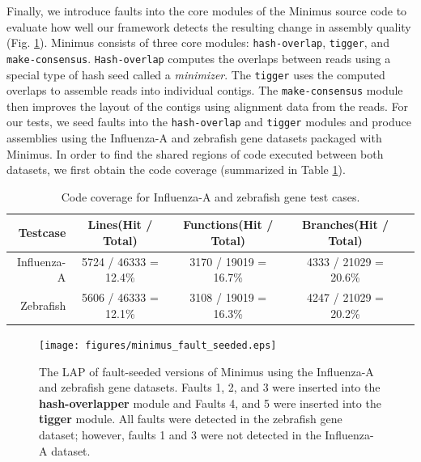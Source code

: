 \documentclass[12pt,\mydriver]{thesis}
\begin{document}
Finally, we introduce faults into the core modules of the Minimus source code to evaluate how well our framework detects the resulting change in assembly quality (Fig. \ref{fig:minimus_fault_seeded}).
Minimus consists of three core modules: \texttt{hash-overlap}, \texttt{tigger}, and \texttt{make-consensus}.
\texttt{Hash-overlap} computes the overlaps between reads using a special type of hash seed called a \emph{minimizer}\cite{roberts2004reducing}.
The \texttt{tigger} uses the computed overlaps to assemble reads into individual contigs.
The \texttt{make-consensus} module then improves the layout of the contigs using alignment data from the reads.
For our tests, we seed faults into the \texttt{hash-overlap} and \texttt{tigger} modules and produce assemblies using the Influenza-A and zebrafish gene datasets packaged with Minimus.
In order to find the shared regions of code executed between both datasets, we first obtain the code coverage (summarized in Table \ref{Tab:codecoverage}).



\renewcommand{\baselinestretch}{1}
\small\normalsize


\begin{table}[htbp]
\caption{Code coverage for Influenza-A and zebrafish gene test cases.}
\label{Tab:codecoverage}
\begin{center}
\begin{tabular}{r|cccc}
Testcase & Lines(Hit / Total) & Functions(Hit / Total) & Branches(Hit / Total)\\ \hline
Influenza-A & 5724 / 46333 = 12.4\% & 3170 / 19019 = 16.7\% & 4333 / 21029 = 20.6\% \\
Zebrafish & 5606 / 46333 = 12.1\%  & 3108 / 19019 = 16.3\% & 4247 / 21029 = 20.2\% \\
\hline
\end{tabular}
\end{center}
\end{table}

\renewcommand{\baselinestretch}{2}
\small\normalsize

\begin{figure}[!htb]\begin{center}
  \texttt{[image: figures/minimus\_fault\_seeded.eps]}
\end{center}
\renewcommand{\baselinestretch}{1}
\small\normalsize
\begin{quote}
\caption[LAP scores for fault-seeded versions of Minimus]{The LAP of fault-seeded versions of Minimus using the Influenza-A and zebrafish gene datasets.  Faults 1, 2, and 3 were inserted into the \textbf{hash-overlapper} module and Faults 4, and 5 were inserted into the \textbf{tigger} module. All faults were detected in the zebrafish gene dataset; however, faults 1 and 3 were not detected in the Influenza-A dataset.}
\label{fig:minimus_fault_seeded}
\end{quote}
\end{figure}
\renewcommand{\baselinestretch}{2}
\small\normalsize
\end{document}
